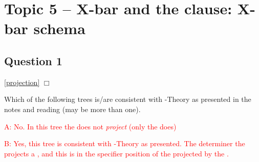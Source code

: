 \documentclass{article}
\begin{document}
\newpage
\section*{Topic 5 -- X-bar and the clause: X-bar schema}
\subsection*{Question 1}%
\hfill{}\ref{projection} $\Box$

Which of the following trees is/are consistent with -Theory as presented in the notes and reading (may be more than one).
\begin{exe}
\end{exe}
\textcolor{red}{A: No. In this tree the  does not \emph{project} (only the  does)}

\textcolor{red}{B: Yes, this tree is consistent with -Theory as presented.
The determiner the projects a , and this is in the specifier position of the  projected by the .}
\end{document}

